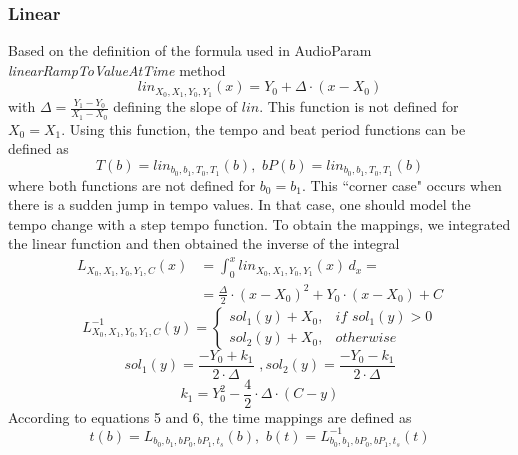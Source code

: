 \documentclass{sig-alternate}
\begin{document}
\subsubsection{Linear}
Based on the definition of the formula used in AudioParam \textit{linearRampToValueAtTime} method
\begin{equation}
lin_{X_0,X_1,Y_0,Y_1}(x) = Y_0 + \Delta \cdot (x - X_0)
\end{equation}
with $\Delta = \frac{Y_1-Y_0}{X_1-X_0}$ defining the slope of $lin$. This function is not defined for $X_0=X_1$. Using this function, the tempo and beat period functions can be defined as
\begin{displaymath}
T(b)=lin_{b_0,b_1,T_0,T_1}(b),\,\,bP(b)=lin_{b_0,b_1,T_0,T_1}(b)
\end{displaymath}
where both functions are not defined for $b_0=b_1$. This ``corner case" occurs when there is a sudden jump in tempo values. In that case, one should model the tempo change with a step tempo function. To obtain the mappings, we integrated the linear function and then obtained the inverse of the integral
\begin{equation}
\begin{split}
	 L_{X_0,X_1,Y_0,Y_1,C}(x) &=\int_{0}^{x} lin_{X_0,X_1,Y_0,Y_1}(x)\,d_x =\\
	&= \frac{\Delta}{2} \cdot (x-X_0)^{2} + Y_0 \cdot (x-X_0) + C
\end{split}
\end{equation}
\begin{equation}
L_{X_0,X_1,Y_0,Y_1,C}^{-1}(y) = \left\{\begin{array}{lll}
	sol_{1}(y) + X_0, & if\,\,sol_{1}(y)>0\\
	sol_{2}(y) + X_0, & otherwise
            \end{array}\right.
\end{equation}
\begin{displaymath} 
sol_{1}(y) = \frac{- Y_0 + k_1}{2 \cdot \Delta} \,\, , sol_{2}(y) = \frac{- Y_0 - k_1}{2 \cdot \Delta}
\end{displaymath}
\begin{displaymath} 
k_1 = Y_{0}^2 - \frac{4}{2} \cdot \Delta \cdot (C - y) 
\end{displaymath}
According to equations 5 and 6, the time mappings  are defined as
\begin{displaymath}
t(b) = L_{b_0,b_1,bP_0,bP_1,t_s}(b),\,\,b(t) = L_{b_0,b_1,bP_0,bP_1,t_s}^{-1}(t)
\end{displaymath}
\end{document}
